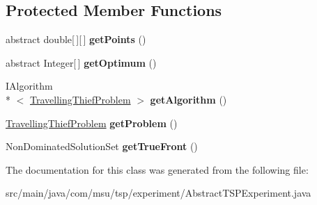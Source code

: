 \subsection*{Protected Member Functions}
\begin{DoxyCompactItemize}
\item 
\hypertarget{classcom_1_1msu_1_1tsp_1_1experiment_1_1AbstractTSPExperiment_ac93a047cb36695f583c582125cd10552}{abstract double\mbox{[}$\,$\mbox{]}\mbox{[}$\,$\mbox{]} {\bfseries get\-Points} ()}\label{classcom_1_1msu_1_1tsp_1_1experiment_1_1AbstractTSPExperiment_ac93a047cb36695f583c582125cd10552}

\item 
\hypertarget{classcom_1_1msu_1_1tsp_1_1experiment_1_1AbstractTSPExperiment_aa2dbdc845df365fc345aab7192328c93}{abstract Integer\mbox{[}$\,$\mbox{]} {\bfseries get\-Optimum} ()}\label{classcom_1_1msu_1_1tsp_1_1experiment_1_1AbstractTSPExperiment_aa2dbdc845df365fc345aab7192328c93}

\item 
\hypertarget{classcom_1_1msu_1_1tsp_1_1experiment_1_1AbstractTSPExperiment_a579feb24e16e82539501353790c3c107}{I\-Algorithm\\*
$<$ \hyperlink{classcom_1_1msu_1_1thief_1_1problems_1_1TravellingThiefProblem}{Travelling\-Thief\-Problem} $>$ {\bfseries get\-Algorithm} ()}\label{classcom_1_1msu_1_1tsp_1_1experiment_1_1AbstractTSPExperiment_a579feb24e16e82539501353790c3c107}

\item 
\hypertarget{classcom_1_1msu_1_1tsp_1_1experiment_1_1AbstractTSPExperiment_a6f5c172cffcff1458591ec8d44cb8d12}{\hyperlink{classcom_1_1msu_1_1thief_1_1problems_1_1TravellingThiefProblem}{Travelling\-Thief\-Problem} {\bfseries get\-Problem} ()}\label{classcom_1_1msu_1_1tsp_1_1experiment_1_1AbstractTSPExperiment_a6f5c172cffcff1458591ec8d44cb8d12}

\item 
\hypertarget{classcom_1_1msu_1_1tsp_1_1experiment_1_1AbstractTSPExperiment_a29b30ab38b406a029bc5b7a994584543}{Non\-Dominated\-Solution\-Set {\bfseries get\-True\-Front} ()}\label{classcom_1_1msu_1_1tsp_1_1experiment_1_1AbstractTSPExperiment_a29b30ab38b406a029bc5b7a994584543}

\end{DoxyCompactItemize}


The documentation for this class was generated from the following file\-:\begin{DoxyCompactItemize}
\item 
src/main/java/com/msu/tsp/experiment/Abstract\-T\-S\-P\-Experiment.\-java\end{DoxyCompactItemize}
